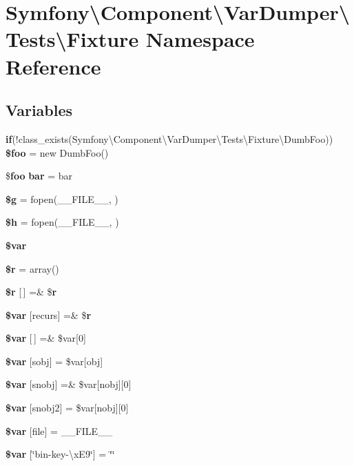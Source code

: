 \section{Symfony\textbackslash{}Component\textbackslash{}Var\+Dumper\textbackslash{}Tests\textbackslash{}Fixture Namespace Reference}
\label{namespace_symfony_1_1_component_1_1_var_dumper_1_1_tests_1_1_fixture}
\subsection*{Variables}
\begin{DoxyCompactItemize}
\item 
{\bf if}(!class\+\_\+exists(\textquotesingle{}Symfony\textbackslash{}\+Component\textbackslash{}\+Var\+Dumper\textbackslash{}\+Tests\textbackslash{}\+Fixture\textbackslash{}\+Dumb\+Foo\textquotesingle{})) {\bf \$foo} = new Dumb\+Foo()
\item 
\${\bf foo} {\bf bar} = \textquotesingle{}bar\textquotesingle{}
\item 
{\bf \$g} = fopen(\+\_\+\+\_\+\+F\+I\+L\+E\+\_\+\+\_\+, \textquotesingle{})
\item 
{\bf \$h} = fopen(\+\_\+\+\_\+\+F\+I\+L\+E\+\_\+\+\_\+, \textquotesingle{})
\item 
{\bf \$var}
\item 
{\bf \$r} = array()
\item 
{\bf \$r} [$\,$] =\& \${\bf r}
\item 
{\bf \$var} [\textquotesingle{}recurs\textquotesingle{}] =\& \${\bf r}
\item 
{\bf \$var} [$\,$] =\& \$var[0]
\item 
{\bf \$var} [\textquotesingle{}sobj\textquotesingle{}] = \$var[\textquotesingle{}obj\textquotesingle{}]
\item 
{\bf \$var} [\textquotesingle{}snobj\textquotesingle{}] =\& \$var[\textquotesingle{}nobj\textquotesingle{}][0]
\item 
{\bf \$var} [\textquotesingle{}snobj2\textquotesingle{}] = \$var[\textquotesingle{}nobj\textquotesingle{}][0]
\item 
{\bf \$var} [\textquotesingle{}file\textquotesingle{}] = \+\_\+\+\_\+\+F\+I\+L\+E\+\_\+\+\_\+
\item 
{\bf \$var} [\char`\"{}bin-\/key-\/\textbackslash{}x\+E9\char`\"{}] = \char`\"{}\char`\"{}
\end{DoxyCompactItemize}


